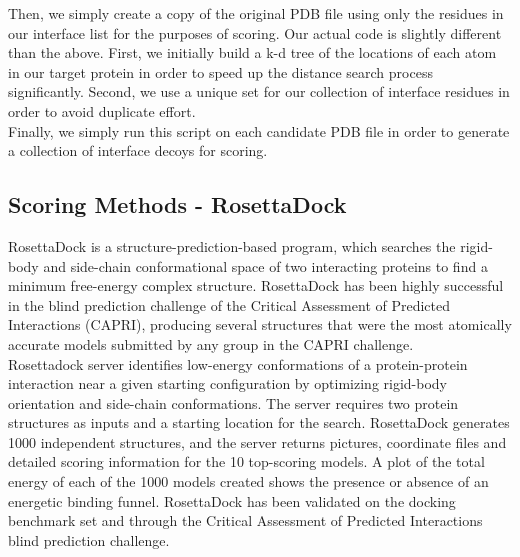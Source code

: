 \documentclass{article}
\begin{document}
Then, we simply create a copy of the original PDB file using only the residues in our interface list for the purposes of scoring.  Our actual code is slightly different than the above.  First, we initially build a k-d tree of the locations of each atom in our target protein in order to speed up the distance search process significantly.  Second, we use a unique set for our collection of interface residues in order to avoid duplicate effort.\\

Finally, we simply run this script on each candidate PDB file in order to generate a collection of interface decoys for scoring.

\subsection{Scoring Methods - RosettaDock}

RosettaDock is a structure-prediction-based program, which searches the rigid-body and side-chain conformational space of two interacting proteins to find a minimum free-energy complex structure. RosettaDock has been highly successful in the blind prediction challenge of the Critical Assessment of Predicted Interactions (CAPRI), producing several structures that were the most atomically accurate models submitted by any group in the CAPRI challenge. \\

Rosettadock server identifies low-energy conformations of a protein-protein interaction near a given starting configuration by optimizing rigid-body orientation and side-chain conformations. The server requires two protein structures as inputs and a starting location for the search. RosettaDock generates 1000 independent structures, and the server returns pictures, coordinate files and detailed scoring information for the 10 top-scoring models. A plot of the total energy of each of the 1000 models created shows the presence or absence of an energetic binding funnel. RosettaDock has been validated on the docking benchmark set and through the Critical Assessment of Predicted Interactions blind prediction challenge.
\end{document}
